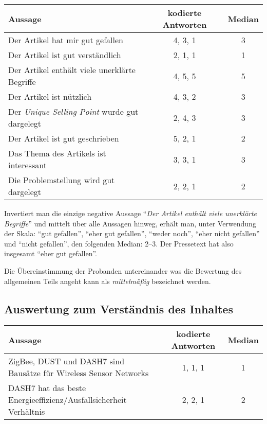 \begin{table}[!ht]
    \begin{center}
        \begin{tabular}{lcc}
        \toprule
        \textbf{Aussage} & \textbf{kodierte Antworten} & \textbf{Median} \\
        \midrule
        Der Artikel hat mir gut gefallen & 4, 3, 1 & 3 \\
        Der Artikel ist gut verständlich & 2, 1, 1 & 1 \\
        Der Artikel enthält viele unerklärte Begriffe & 4, 5, 5 & 5 \\
        Der Artikel ist nützlich & 4, 3, 2 & 3 \\
        Der \emph{Unique Selling Point} wurde gut dargelegt & 2, 4, 3 & 3 \\
        Der Artikel ist gut geschrieben & 5, 2, 1 & 2 \\
        Das Thema des Artikels ist interessant & 3, 3, 1 & 3 \\
        Die Problemstellung wird gut dargelegt & 2, 2, 1 & 2 \\
        \bottomrule
        \end{tabular}
    \end{center}
\end{table}

Invertiert man die einzige negative Aussage \enquote{\emph{Der Artikel enthält
viele unerklärte Begriffe}} und mittelt über alle Aussagen hinweg, erhält man,
unter Verwendung der Skala: \enquote{gut gefallen}, \enquote{eher gut
gefallen}, \enquote{weder noch}, \enquote{eher nicht gefallen} und
\enquote{nicht gefallen}, den folgenden Median: 2--3.
Der Pressetext hat also insgesamt \enquote{eher gut gefallen}.

Die Übereinstimmung der Probanden untereinander was die Bewertung des
allgemeinen Teils angeht kann als \emph{mittelmäßig} bezeichnet werden.


\subsection{Auswertung zum Verständnis des Inhaltes}

\begin{table}[!ht]
    \begin{center}
        \begin{tabular}{p{8cm}cc}
        \toprule
        \textbf{Aussage} & \textbf{kodierte Antworten} & \textbf{Median} \\
        \midrule
        ZigBee, DUST und DASH7 sind Bausätze für Wireless Sensor Networks & 1, 1, 1 & 1 \\
        \addlinespace
        DASH7 hat das beste Energieeffizienz/Ausfallsicherheit Verhältnis & 2, 2, 1 & 2 \\
        \bottomrule
        \end{tabular}
    \end{center}
\end{table}

